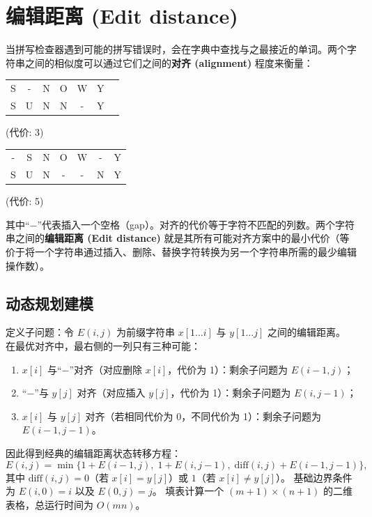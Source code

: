 \section{编辑距离 (Edit distance)}

当拼写检查器遇到可能的拼写错误时，会在字典中查找与之最接近的单词。两个字符串之间的相似度可以通过它们之间的\textbf{对齐 (alignment)} 程度来衡量：

\begin{center}
\begin{tabular}{ccccccc}
S & - & N & O & W & Y \\
S & U & N & N & - & Y
\end{tabular}
\quad (代价: 3)
\qquad
\begin{tabular}{ccccccc}
- & S & N & O & W & - & Y \\
S & U & N & - & - & N & Y
\end{tabular}
\quad (代价: 5)
\end{center}

其中“$-$”代表插入一个空格（gap）。对齐的代价等于字符不匹配的列数。两个字符串之间的\textbf{编辑距离 (Edit distance)} 就是其所有可能对齐方案中的最小代价（等价于将一个字符串通过插入、删除、替换字符转换为另一个字符串所需的最少编辑操作数）。

\subsection*{动态规划建模}
定义子问题：令 $E(i, j)$ 为前缀字符串 $x[1 \dots i]$ 与 $y[1 \dots j]$ 之间的编辑距离。
在最优对齐中，最右侧的一列只有三种可能：
\begin{enumerate}
    \item $x[i]$ 与“$-$”对齐（对应删除 $x[i]$，代价为 1）：剩余子问题为 $E(i - 1, j)$；
    \item “$-$”与 $y[j]$ 对齐（对应插入 $y[j]$，代价为 1）：剩余子问题为 $E(i, j - 1)$；
    \item $x[i]$ 与 $y[j]$ 对齐（若相同代价为 0，不同代价为 1）：剩余子问题为 $E(i - 1, j - 1)$。
\end{enumerate}

因此得到经典的编辑距离状态转移方程：
\[
E(i, j) = \min \{1 + E(i - 1, j),\; 1 + E(i, j - 1),\; \text{diff}(i, j) + E(i - 1, j - 1)\},
\]
其中 $\text{diff}(i, j) = 0$（若 $x[i] = y[j]$）或 $1$（若 $x[i] \ne y[j]$）。
基础边界条件为 $E(i, 0) = i$ 以及 $E(0, j) = j$。
填表计算一个 $(m + 1) \times (n + 1)$ 的二维表格，总运行时间为 $O(mn)$。

